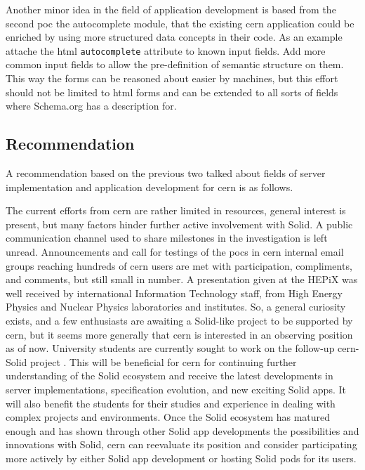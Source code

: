 Another minor idea in the field of application development is based from the second \gls{poc} the autocomplete module, that the existing \gls{cern} application could be enriched by using more structured data concepts in their code. As an example attache the \gls{html} \texttt{autocomplete} attribute to known input fields. Add more common input fields to allow the pre-definition of semantic structure on them. This way the forms can be reasoned about easier by machines, but this effort should not be limited to \gls{html} forms and can be extended to all sorts of fields where Schema.org has a description for.

\subsection{Recommendation}

A recommendation based on the previous two talked about fields of server implementation and application development for \gls{cern} is as follows.

The current efforts from \gls{cern} are rather limited in resources, general interest is present, but many factors hinder further active involvement with Solid. A public communication channel used to share milestones in the investigation is left unread. Announcements and call for testings of the \glspl{poc} in \gls{cern} internal email groups reaching hundreds of \gls{cern} users are met with participation, compliments, and comments, but still small in number. A presentation given at the HEPiX \cite{hepix} was well received by international Information Technology staff, from High Energy Physics and Nuclear Physics laboratories and institutes. So, a general curiosity exists, and a few enthusiasts are awaiting a Solid-like project to be supported by \gls{cern}, but it seems more generally that \gls{cern} is interested in an observing position as of now. University students are currently sought to work on the follow-up \gls{cern}-Solid project \cite{cern-slides}. This will be beneficial for \gls{cern} for continuing further understanding of the Solid ecosystem and receive the latest developments in server implementations, specification evolution, and new exciting Solid apps. It will also benefit the students for their studies and experience in dealing with complex projects and environments. Once the Solid ecosystem has matured enough and has shown through other Solid app developments the possibilities and innovations with Solid, \gls{cern} can reevaluate its position and consider participating more actively by either Solid app development or hosting Solid pods for its users.
